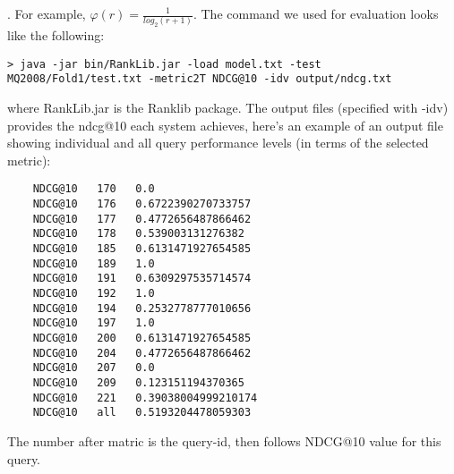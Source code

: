 . For example, $\varphi (r) = \frac{1}{log_{2}\left ( r+1 \right )}$.
The command we used for evaluation looks like the following:
\begin{lstlisting}
> java -jar bin/RankLib.jar -load model.txt -test MQ2008/Fold1/test.txt -metric2T NDCG@10 -idv output/ndcg.txt
\end{lstlisting}
 where RankLib.jar is the Ranklib package. The output files (specified with -idv) provides the ndcg@10 each system achieves, here's an example of an output file showing individual and all query performance levels (in terms of the selected metric):
 \begin{lstlisting}
    NDCG@10   170   0.0
    NDCG@10   176   0.6722390270733757
    NDCG@10   177   0.4772656487866462
    NDCG@10   178   0.539003131276382
    NDCG@10   185   0.6131471927654585
    NDCG@10   189   1.0
    NDCG@10   191   0.6309297535714574
    NDCG@10   192   1.0
    NDCG@10   194   0.2532778777010656
    NDCG@10   197   1.0
    NDCG@10   200   0.6131471927654585
    NDCG@10   204   0.4772656487866462
    NDCG@10   207   0.0
    NDCG@10   209   0.123151194370365
    NDCG@10   221   0.39038004999210174
    NDCG@10   all   0.5193204478059303
\end{lstlisting}
The number after matric is the query-id, then follows NDCG@10 value for this query.

